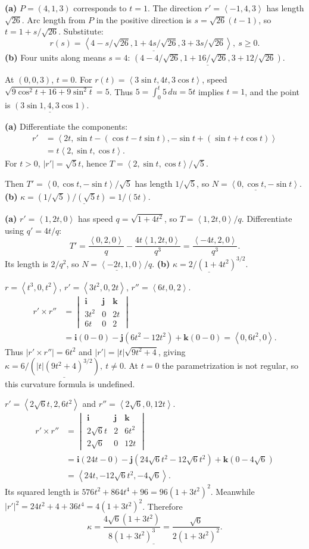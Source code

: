 \documentclass[10pt]{article}
\newcommand{\handstyleA}{\handA\fontsize{9.45}{11.35}\selectfont}
\newcommand{\handstyleB}{\handB\fontsize{9.35}{11.25}\selectfont}
\newcommand{\handstyleC}{\handC\fontsize{9.55}{11.45}\selectfont}
\newcommand{\ex}[1]{\par\addvspace{6pt}\noindent\llap{\makebox[.62in][r]{\large\bfseries #1.\hspace{.12in}}}\ignorespaces}
\newcommand{\ans}[1]{\underline{#1}}
\newcommand{\vv}[1]{\left\langle #1\right\rangle}
\newcommand{\ii}{\mathbf i}\newcommand{\jj}{\mathbf j}\newcommand{\kk}{\mathbf k}
\newcommand{\cp}[6]{\begin{vmatrix}\ii&\jj&\kk\\#1&#2&#3\\#4&#5&#6\end{vmatrix}}
\begin{document}
\handstyleB
\ex{15}
\textbf{(a)} $P=(4,1,3)$ corresponds to $t=1$. The direction $r'=\vv{-1,4,3}$ has length $\sqrt{26}$. Arc length from $P$ in the positive direction is $s=\sqrt{26}(t-1)$, so $t=1+s/\sqrt{26}$. Substitute:
\[\ans{r(s)=\vv{4-s/\sqrt{26},1+4s/\sqrt{26},3+3s/\sqrt{26}},\ s\ge0}.\]
\textbf{(b)} Four units along means $s=4$: $\ans{(4-4/\sqrt{26},1+16/\sqrt{26},3+12/\sqrt{26})}$.
\handstyleA
\ex{17}
At $(0,0,3)$, $t=0$. For $r(t)=\vv{3\sin t,4t,3\cos t}$, speed $\sqrt{9\cos^2t+16+9\sin^2t}=5$. Thus $5=\int_0^t5\,du=5t$ implies $t=1$, and the point is $\ans{(3\sin1,4,3\cos1)}$.
\handstyleC
\ex{19}
\textbf{(a)} Differentiate the components:
\[\begin{aligned}r'&=\vv{2t,\sin t-(\cos t-t\sin t),-\sin t+(\sin t+t\cos t)}\\&=t\vv{2,\sin t,\cos t}.\end{aligned}\]
For $t>0$, $|r'|=\sqrt5t$, hence $T=\vv{2,\sin t,\cos t}/\sqrt5$.\par Then $T'=\vv{0,\cos t,-\sin t}/\sqrt5$ has length $1/\sqrt5$, so $\ans{N=\vv{0,\cos t,-\sin t}}$.
\textbf{(b)} $\ans{\kappa=(1/\sqrt5)/(\sqrt5t)=1/(5t)}$.
\handstyleA
\ex{21}
\textbf{(a)} $r'=\vv{1,2t,0}$ has speed $q=\sqrt{1+4t^2}$, so $T=\vv{1,2t,0}/q$. Differentiate using $q'=4t/q$:
\[T'=\frac{\vv{0,2,0}}q-\frac{4t\vv{1,2t,0}}{q^3}=\frac{\vv{-4t,2,0}}{q^3}.\]
Its length is $2/q^2$, so $\ans{N=\vv{-2t,1,0}/q}$.
\textbf{(b)} $\ans{\kappa=2/(1+4t^2)^{3/2}}$.
\handstyleB
\ex{25}
$r=\vv{t^3,0,t^2}$, $r'=\vv{3t^2,0,2t}$, $r''=\vv{6t,0,2}$.
\begin{align*}r'\times r''&=\cp{3t^2}{0}{2t}{6t}{0}{2}\\&=\ii(0-0)-\jj(6t^2-12t^2)+\kk(0-0)=\vv{0,6t^2,0}.\end{align*}
Thus $|r'\times r''|=6t^2$ and $|r'|=|t|\sqrt{9t^2+4}$, giving $\ans{\kappa=6/(|t|(9t^2+4)^{3/2}),\ t\ne0}$. At $t=0$ the parametrization is not regular, so this curvature formula is undefined.
\handstyleC
\ex{27}
$r'=\vv{2\sqrt6t,2,6t^2}$ and $r''=\vv{2\sqrt6,0,12t}$.
\begin{align*}r'\times r''&=\cp{2\sqrt6t}{2}{6t^2}{2\sqrt6}{0}{12t}\\&=\ii(24t-0)-\jj(24\sqrt6t^2-12\sqrt6t^2)+\kk(0-4\sqrt6)\\&=\vv{24t,-12\sqrt6t^2,-4\sqrt6}.\end{align*}
Its squared length is $576t^2+864t^4+96=96(1+3t^2)^2$. Meanwhile $|r'|^2=24t^2+4+36t^4=4(1+3t^2)^2$. Therefore
\[\ans{\kappa=\frac{4\sqrt6(1+3t^2)}{8(1+3t^2)^3}=\frac{\sqrt6}{2(1+3t^2)^2}}.\]
\handstyleA
\ex{31}
\end{document}
